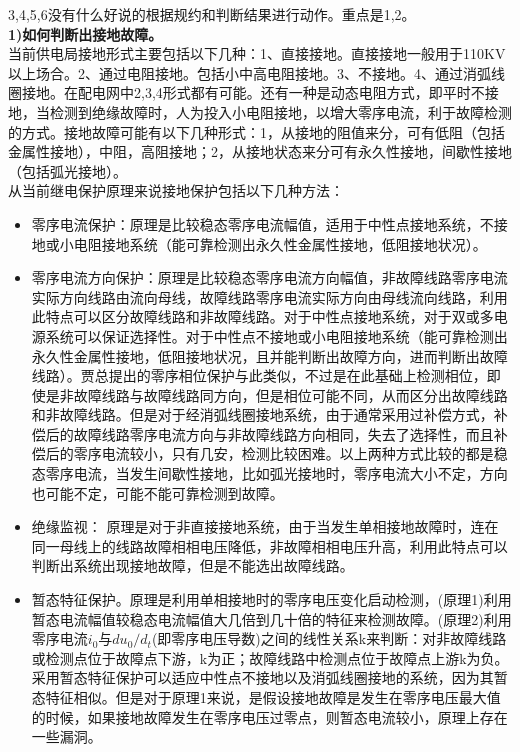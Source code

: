 \documentclass{article}
\begin{document}
\begin{CJK}{UTF8}{gbsn}
\begin{enumerate}
	3,4,5,6没有什么好说的根据规约和判断结果进行动作。重点是1,2。\\
	\textbf{1)如何判断出接地故障。}\\
	当前供电局接地形式主要包括以下几种：1、直接接地。直接接地一般用于110KV以上场合。2、通过电阻接地。包括小中高电阻接地。3、不接地。4、通过消弧线圈接地。在配电网中2,3,4形式都有可能。还有一种是动态电阻方式，即平时不接地，当检测到绝缘故障时，人为投入小电阻接地，以增大零序电流，利于故障检测的方式。接地故障可能有以下几种形式：1，从接地的阻值来分，可有低阻（包括金属性接地），中阻，高阻接地；2，从接地状态来分可有永久性接地，间歇性接地（包括弧光接地）。\\
	从当前继电保护原理来说接地保护包括以下几种方法：
	\begin{itemize}
			\item 零序电流保护：原理是比较稳态零序电流幅值，适用于中性点接地系统，不接地或小电阻接地系统（能可靠检测出永久性金属性接地，低阻接地状况）。
			\item 零序电流方向保护：原理是比较稳态零序电流方向幅值，非故障线路零序电流实际方向线路由流向母线，故障线路零序电流实际方向由母线流向线路，利用此特点可以区分故障线路和非故障线路。对于中性点接地系统，对于双或多电源系统可以保证选择性。对于中性点不接地或小电阻接地系统（能可靠检测出永久性金属性接地，低阻接地状况，且并能判断出故障方向，进而判断出故障线路）。贾总提出的零序相位保护与此类似，不过是在此基础上检测相位，即使是非故障线路与故障线路同方向，但是相位可能不同，从而区分出故障线路和非故障线路。但是对于经消弧线圈接地系统，由于通常采用过补偿方式，补偿后的故障线路零序电流方向与非故障线路方向相同，失去了选择性，而且补偿后的零序电流较小，只有几安，检测比较困难。以上两种方式比较的都是稳态零序电流，当发生间歇性接地，比如弧光接地时，零序电流大小不定，方向也可能不定，可能不能可靠检测到故障。
			\item 绝缘监视： 原理是对于非直接接地系统，由于当发生单相接地故障时，连在同一母线上的线路故障相相电压降低，非故障相相电压升高，利用此特点可以判断出系统出现接地故障，但是不能选出故障线路。
			\item 暂态特征保护\cite{p1}。原理是利用单相接地时的零序电压变化启动检测，(原理1)利用暂态电流幅值较稳态电流幅值大几倍到几十倍的特征来检测故障。(原理2)利用零序电流$i_0$与$du_0/d_t$(即零序电压导数)之间的线性关系k来判断：对非故障线路或检测点位于故障点下游，k为正；故障线路中检测点位于故障点上游k为负。采用暂态特征保护可以适应中性点不接地以及消弧线圈接地的系统，因为其暂态特征相似。但是对于原理1来说，是假设接地故障是发生在零序电压最大值的时候，如果接地故障发生在零序电压过零点，则暂态电流较小，原理上存在一些漏洞。\\

\end{itemize}
\end{enumerate}
\end{CJK}
\end{document}
